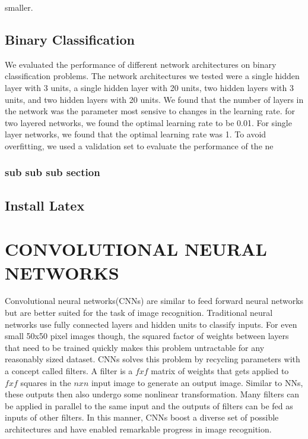 \documentclass[10pt,twoside]{article}
\begin{document}
\noindent smaller.

\subsection{Binary Classification}

We evaluated the performance of different network architectures on binary classification problems. The network architectures we tested were a single hidden layer with 3 units, a single hidden layer with 20 units, two hidden layers with 3 units, and two hidden layers with 20 units. We found that the number of layers in the network was the parameter most sensive to changes in the learning rate. for two layered networks, we found the optimal learning rate to be 0.01. For single layer networks, 
we found that the optimal learning rate was 1. To avoid overfitting, we used a validation set to evaluate the performance of the ne

\subsubsection{sub sub sub section}


\subsection{Install Latex}


\section{\uppercase{Convolutional Neural Networks}}

\noindent Convolutional neural networks(CNNs) are similar to feed forward neural networks but are better suited for the task of image recognition. Traditional neural networks use fully connected layers and hidden units to classify inputs. For even small 50x50 pixel images though, the squared factor of weights between layers that need to be trained quickly makes this problem untractable for any reasonably sized dataset.  CNNs solves this problem by recycling parameters with a concept called filters. A filter is a $fxf$ matrix of weights that gets applied to $fxf$ squares in the $nxn$ input image to generate an output image. Similar to NNs, these outputs then also undergo some nonlinear transformation. Many filters can be applied in parallel to the same input and the outputs of filters can be fed as inputs of other filters. In this manner, CNNs boost a diverse set of possible architectures and have enabled remarkable progress in image recognition.
\end{document}
